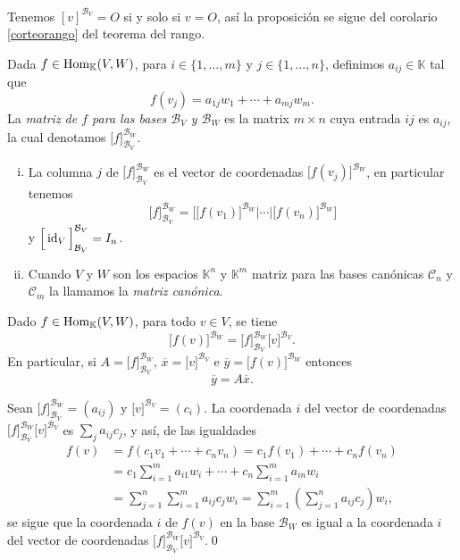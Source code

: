 \dem Tenemos $\left[ v \right]^{\mathcal{B}_V}=O$ si y solo si $v=O$, as\'i la proposici\'on se sigue del corolario \ref{corteorango} del teorema del rango. 

\begin{defn}
Dada $f\in\operatorname{Hom}_{\mathbb{K}}(V,W)$, para $i\in\{1,\ldots,m\}$ y $j\in\{1,\ldots,n\}$, definimos $a_{ij}\in \mathbb{K}$ tal que
$$f(v_j)=a_{1j}w_1+\cdots+a_{mj}w_m.$$
La \emph{matriz de $f$ para las bases $\mathcal{B}_V$ y $\mathcal{B}_W$} es la matrix $m\times n$ cuya entrada $ij$ es $a_{ij}$, la cual denotamos $\Big[ f \Big]^{\mathcal{B}_W}_{\mathcal{B}_V}$.
\end{defn}

\begin{obs}
\begin{enumerate}[(i)]
  \item La columna $j$ de $\Big[ f \Big]^{\mathcal{B}_W}_{\mathcal{B}_V}$ es el vector de coordenadas $\Big[f(v_j)\Big]^{\mathcal{B}_W}$, en particular tenemos 
$$\Big[f\Big]^{\mathcal{B}_W}_{\mathcal{B}_V}=\Bigg[\Big[ f(v_1)\Big]^{\mathcal{B}_W}\Big|\cdots \Big| \Big[ f(v_n)\Big]^{\mathcal{B}_W}\Bigg]$$
  y $\Big[\operatorname{id}_V\Big]^{\mathcal{B}_V}_{\mathcal{B}_V}=I_n$.
  \item Cuando $V$ y $W$ son los espacios $\mathbb{K}^n$ y $\mathbb{K}^m$ matriz para las bases canónicas $\mathcal{C}_n$ y $\mathcal{C}_m$ la llamamos la \emph{matriz canónica}.
\end{enumerate}
\end{obs}

\begin{prop}
Dado $f\in\operatorname{Hom}_{\mathbb{K}}(V,W)$, para todo $v\in V$, se tiene
$$\Big[ f(v)\Big]^{\mathcal{B}_W}=\Big[ f \Big]^{\mathcal{B}_W}_{\mathcal{B}_V}\Big[ v \Big]^{\mathcal{B}_V}.$$
En particular, si $A=\Big[ f \Big]^{\mathcal{B}_W}_{\mathcal{B}_V}$, $\overline{x}=\Big[ v \Big]^{\mathcal{B}_V}$ e $\overline{y}=\Big[ f(v)\Big]^{\mathcal{B}_W}$ entonces
$$\overline{y}=A\overline{x}.$$
\end{prop}

\dem Sean $\Big[ f \Big]^{\mathcal{B}_W}_{\mathcal{B}_V}=(a_{ij})$ y $\Big[v\Big]^{\mathcal{B}_V}=(c_i)$. La coordenada $i$ del vector de coordenadas $\Big[ f \Big]^{\mathcal{B}_W}_{\mathcal{B}_V}\Big[ v \Big]^{\mathcal{B}_V}$ es $\sum_j a_{ij}c_j$, y as\'i, de las igualdades
\begin{align*}
f(v) & = f(c_1v_1+\cdots+c_nv_n)=c_1f(v_1)+\cdots+c_nf(v_n)\\
 & = c_1\sum_{i=1}^m a_{i1}w_i+\cdots+c_n\sum_{i=1}^m a_{in}w_i\\
 & = \sum_{j=1}^n\sum_{i=1}^m a_{ij}c_jw_i=\sum_{i=1}^m\left(\sum_{j=1}^n a_{ij}c_j\right)w_i,
\end{align*}
se sigue que la coordenada $i$ de $f(v)$ en la base $\mathcal{B}_W$ es igual a la coordenada $i$ del vector de coordenadas  $\Big[ f \Big]^{\mathcal{B}_W}_{\mathcal{B}_V}\Big[ v \Big]^{\mathcal{B}_V}$.\qed

